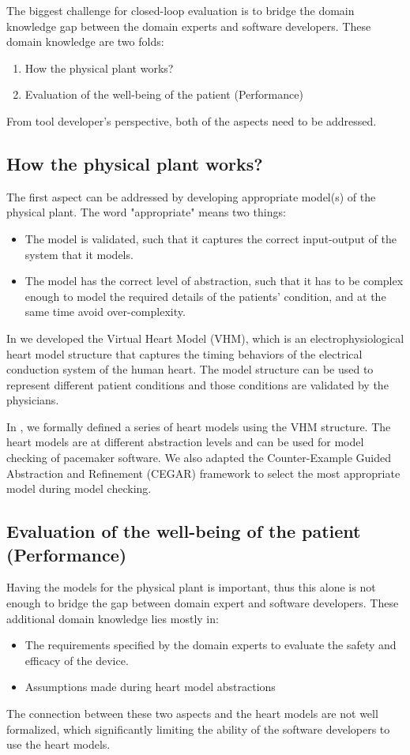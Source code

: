 \documentclass{llncs}
\begin{document}
The biggest challenge for closed-loop evaluation is to bridge the domain knowledge gap between the domain experts and software developers. These domain knowledge are two folds:
\begin{enumerate}
	\item How the physical plant works?
    \item Evaluation of the well-being of the patient (Performance)
\end{enumerate}
From tool developer's perspective, both of the aspects need to be addressed.
\subsection{How the physical plant works?}
The first aspect can be addressed by developing appropriate model(s) of the physical plant. The word "appropriate" means two things:
\begin{itemize}
	\item The model is validated, such that it captures the correct input-output of the system that it models.
    \item The model has the correct level of abstraction, such that it has to be complex enough to model the required details of the patients' condition, and at the same time avoid over-complexity.
\end{itemize}

In \cite{VHM_proc} we developed the Virtual Heart Model (VHM), which is an electrophysiological heart model structure that captures the timing behaviors of the electrical conduction system of the human heart. The model structure can be used to represent different patient conditions and those conditions are validated by the physicians. 

In \cite{sttt13}, we formally defined a series of heart models using the VHM structure. The heart models are at different abstraction levels and can be used for model checking of pacemaker software. We also adapted the Counter-Example Guided Abstraction and Refinement (CEGAR) framework \cite{cegar} to select the most appropriate model during model checking.

\subsection{Evaluation of the well-being of the patient (Performance)}
Having the models for the physical plant is important, thus this alone is not enough to bridge the gap between domain expert and software developers. These additional domain knowledge lies mostly in:
\begin{itemize}
	\item The requirements specified by the domain experts to evaluate the safety and efficacy of the device.
    \item Assumptions made during heart model abstractions
\end{itemize}
The connection between these two aspects and the heart models are not well formalized, which significantly limiting the ability of the software developers to use the heart models. 
\end{document}
